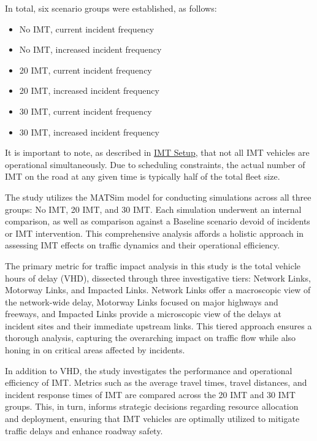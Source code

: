 \documentclass[fancy, oneside, mastersfancy, ms]{byuthesis}
\providecommand{\tightlist}{%
  \setlength{\itemsep}{0pt}\setlength{\parskip}{0pt}}\usepackage{longtable,booktabs,array}
\begin{document}
In total, six scenario groups were established, as follows:

\begin{itemize}
\tightlist
\item
  No IMT, current incident frequency
\item
  No IMT, increased incident frequency
\item
  20 IMT, current incident frequency
\item
  20 IMT, increased incident frequency
\item
  30 IMT, current incident frequency
\item
  30 IMT, increased incident frequency
\end{itemize}

It is important to note, as described in
\protect\hyperlink{sec-IMT_setup}{IMT Setup}, that not all IMT vehicles
are operational simultaneously. Due to scheduling constraints, the
actual number of IMT on the road at any given time is typically half of
the total fleet size.

The study utilizes the MATSim model for conducting simulations across
all three groups: No IMT, 20 IMT, and 30 IMT. Each simulation underwent
an internal comparison, as well as comparison against a Baseline
scenario devoid of incidents or IMT intervention. This comprehensive
analysis affords a holistic approach in assessing IMT effects on traffic
dynamics and their operational efficiency.

The primary metric for traffic impact analysis in this study is the
total vehicle hours of delay (VHD), dissected through three
investigative tiers: Network Links, Motorway Links, and Impacted Links.
Network Links offer a macroscopic view of the network-wide delay,
Motorway Links focused on major highways and freeways, and Impacted
Links provide a microscopic view of the delays at incident sites and
their immediate upstream links. This tiered approach ensures a thorough
analysis, capturing the overarching impact on traffic flow while also
honing in on critical areas affected by incidents.

In addition to VHD, the study investigates the performance and
operational efficiency of IMT. Metrics such as the average travel times,
travel distances, and incident response times of IMT are compared across
the 20 IMT and 30 IMT groups. This, in turn, informs strategic decisions
regarding resource allocation and deployment, ensuring that IMT vehicles
are optimally utilized to mitigate traffic delays and enhance roadway
safety.
\end{document}
